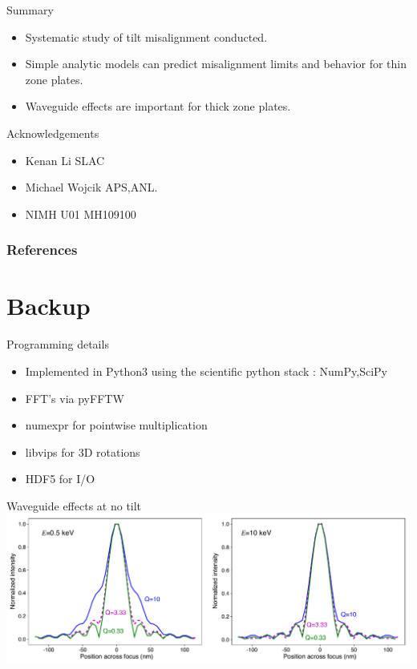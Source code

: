 \documentclass{beamer}
\begin{document}
\begin{frame}{Summary}
	\begin{itemize}
		\item Systematic study of tilt misalignment conducted.
		\item Simple analytic models can predict misalignment limits and behavior for thin zone plates.
		\item Waveguide effects are important for thick zone plates.
	\end{itemize}
\end{frame}


\begin{frame}{Acknowledgements}
  \begin{itemize}
  \item \alert{Kenan Li} SLAC
  \item \alert{Michael Wojcik} APS,ANL.
  \item \alert{NIMH} U01 MH109100
  \end{itemize}
\end{frame}



\renewcommand*{\bibfont}{\scriptsize}
\begin{frame}[t, allowframebreaks]
\frametitle{References}


\end{frame}


\section{Backup}
\begin{frame}{Programming details}
	\begin{itemize}
		\item Implemented in Python3 using the scientific python stack : NumPy,SciPy
		\item FFT's via pyFFTW
		\item numexpr for pointwise multiplication
		\item libvips for 3D rotations
		\item HDF5 for I/O
	\end{itemize}

\end{frame}

\begin{frame}{Waveguide effects at no tilt}
	\includegraphics[scale=0.3]{foc_profiles}
\end{frame}
\end{document}
